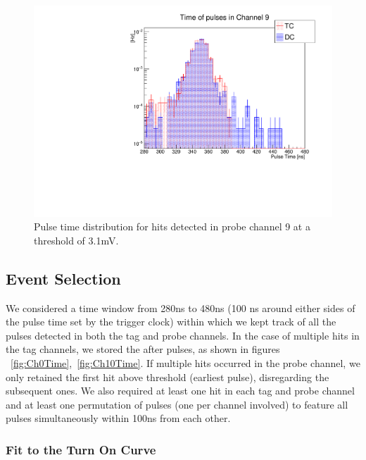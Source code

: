 \documentclass[12pt]{article}
\begin{document}
\begin{figure}[h]
\centering
\centerline{\includegraphics[scale=0.43]{figures/triggerEfficiency/Comparison_Run2196_TC_CH9_Time_vs_Run2194_DC_CH9_Time}}
{\caption{ Pulse time distribution for hits detected in probe channel 9 at a threshold of 3.1mV.  }

\label{fig:Ch9Time}
}
\end{figure}



\subsection{Event Selection} \label{eSelection}
 
We considered a time window from 280ns to 480ns (100 ns around either sides of the pulse time set by the trigger clock) within which we kept track of all the pulses detected in both the tag and probe channels. In the case of multiple hits in the tag channels, we stored the after pulses, as shown in figures  ~\ref{fig:Ch0Time},~\ref{fig:Ch10Time}. If multiple hits occurred in the probe channel, we only retained the first hit above threshold (earliest pulse), disregarding the subsequent ones. We also required at least one hit in each tag and probe channel and at least one permutation of pulses (one per channel involved) to feature all pulses simultaneously within 100ns from each other. \\
 

\subsubsection{Fit to the Turn On Curve}
\end{document}
